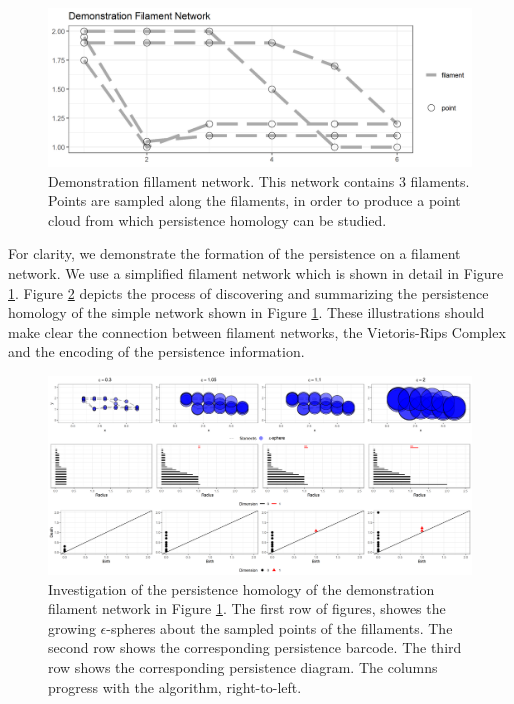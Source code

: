 \documentclass[10pt]{article}
\begin{document}
\begin{figure}[!htbp]
	\begin{center}
		\includegraphics[width=1\textwidth]{figures/filaments_demo.png}
	\end{center}
	\caption{Demonstration fillament network. This network contains 3 filaments. Points are sampled along the filaments, in order to produce a point cloud from which persistence homology can be studied.}
	\label{fig:demoNetwork}
\end{figure}

For clarity, we demonstrate the formation of the persistence on a filament network. We use a simplified filament network which is shown in detail in Figure \ref{fig:demoNetwork}. Figure \ref{fig:persistencediagram} depicts the process of discovering and summarizing the persistence homology of the simple network shown in Figure \ref{fig:demoNetwork}. These illustrations should make clear the connection between filament networks, the Vietoris-Rips Complex and the encoding of the persistence information. 

\begin{figure}[!htbp]
	\begin{center}
		\includegraphics[width=1\textwidth]{figures/filaments_rips.png}
	\end{center}
	\caption{Investigation of the persistence homology of the demonstration filament network in Figure \ref{fig:demoNetwork}. The first row of figures, showes the growing $\epsilon$-spheres about the sampled points of the fillaments. The second row shows the corresponding persistence barcode. The third row shows the corresponding persistence diagram. The columns progress with the algorithm, right-to-left.}
	\label{fig:persistencediagram}
\end{figure}
\end{document}
